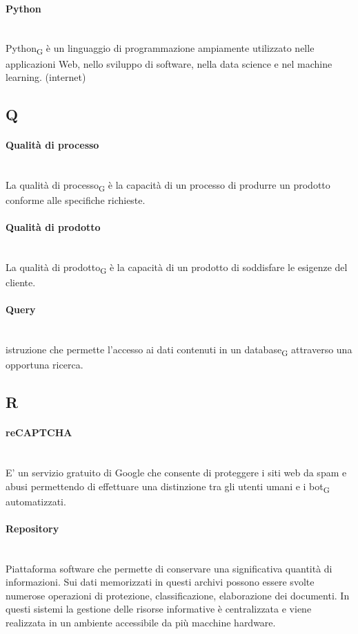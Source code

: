 \paragraph{Python}~\smallskip \\
Python\textsubscript{G} è un linguaggio di programmazione ampiamente utilizzato nelle applicazioni Web, nello sviluppo di software, nella data science e nel machine learning. (internet)
\newpage
{}
\subsection*{Q}
\paragraph{Qualità di processo}~\smallskip \\
La qualità di processo\textsubscript{G} è la capacità di un processo di produrre un prodotto conforme alle specifiche richieste.

\paragraph{Qualità di prodotto}~\smallskip \\
La qualità di prodotto\textsubscript{G} è la capacità di un prodotto di soddisfare le esigenze del cliente.
\paragraph{Query}~\smallskip \\
istruzione che permette l'accesso ai dati contenuti in un database\textsubscript{G} attraverso una opportuna ricerca.

\newpage
{}
\subsection*{R}
\paragraph{reCAPTCHA}~\smallskip \\
E' un servizio gratuito di Google che consente di proteggere i siti web da spam e abusi permettendo di effettuare una distinzione tra gli utenti umani e i bot\textsubscript{G} automatizzati.

\paragraph{Repository}~\smallskip \\
Piattaforma software che permette di conservare una significativa quantità di informazioni. Sui dati memorizzati in questi archivi possono essere svolte numerose operazioni di protezione, classificazione, elaborazione dei documenti. In questi sistemi la gestione delle risorse informative è centralizzata e viene realizzata in un ambiente accessibile da più macchine hardware.


